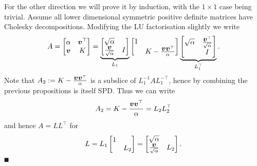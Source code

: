 For the other direction we will prove it by induction, with the $1 \ensuremath{\times} 1$ case being trivial. Assume all lower dimensional symmetric positive definite matrices have Cholesky decompositions. Modifying the LU factorisation slightly we write
\[
A = \begin{bmatrix} \alpha & \bm{{\mbox{\boldmath$v$\unboldmath}}}^\top \\
                    \bm{{\mbox{\boldmath$v$\unboldmath}}}   & K
                    \end{bmatrix} = \underbrace{\begin{bmatrix} \sqrt{\alpha} \\
                                    {\bm{{\mbox{\boldmath$v$\unboldmath}}} \over \sqrt{\alpha}} & I \end{bmatrix}}_{L_1}
                                    \begin{bmatrix} 1  \\ & K - {\bm{{\mbox{\boldmath$v$\unboldmath}}} \bm{{\mbox{\boldmath$v$\unboldmath}}}^\top \over \alpha} \end{bmatrix}
                                    \underbrace{\begin{bmatrix} \sqrt{\alpha} & {\bm{{\mbox{\boldmath$v$\unboldmath}}}^\top \over \sqrt{\alpha}} \\
                                     & I \end{bmatrix}}_{L_1^\top}.
\]
Note that $A_2 := K - {\bm{{\mbox{\boldmath$v$\unboldmath}}} \bm{{\mbox{\boldmath$v$\unboldmath}}}^\top \over \alpha}$ is a subslice of $L_1^{-1} A L_1^{-\ensuremath{\top}}$, hence by combining the previous propositions is itself SPD. Thus we can write
\[
A_2 = K - {\bm{{\mbox{\boldmath$v$\unboldmath}}} \bm{{\mbox{\boldmath$v$\unboldmath}}}^\top \over \alpha} = L_2 L_2^\top
\]
and hence $A = L L^\ensuremath{\top}$ for
\[
L= L_1 \begin{bmatrix}1 \\ & L_2 \end{bmatrix} = \begin{bmatrix} \sqrt{\alpha} \\ {\bm{{\mbox{\boldmath$v$\unboldmath}}} \over \sqrt{\alpha}} & L_2 \end{bmatrix}.
\]
\ensuremath{\QED}

